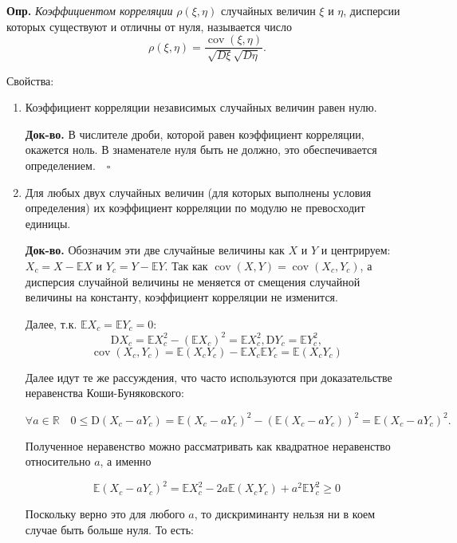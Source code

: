 \documentclass[oneside,final,14pt]{extreport}
\newcommand\mydef{{\bf Опр.}}
\newcommand\myqed{{\bf Док-во.}}
\theoremstyle{definition}
\begin{document}
\mydef{} {\it Коэффициентом корреляции} $\rho(\xi,\eta)$ случайных величин $\xi$ и $\eta$, дисперсии которых существуют и отличны от нуля, называется число
$$\rho(\xi, \eta)=\frac{\operatorname{cov}(\xi, \eta)}{\sqrt{D \xi} \sqrt{D \eta}}.$$

Свойства:

\begin{enumerate}
    \item Коэффициент корреляции независимых случайных величин равен нулю.
    
    \myqed{} В числителе дроби, которой равен коэффициент корреляции,
окажется ноль. В знаменателе нуля быть не должно, это обеспечивается определением.
$ ~~~ \square$

    \item Для любых двух случайных величин (для которых выполнены условия определения) их коэффициент корреляции по модулю не превосходит единицы.
    
    \myqed{} Обозначим эти две случайные величины как $X$ и $Y$ и центрируем: $X_c = X - \mathbb{E}X$ и $Y_c = Y - \mathbb{E}Y$. Так как $\operatorname{cov}(X, Y)=\operatorname{cov}\left(X_{c}, Y_{c}\right)$, а дисперсия случайной величины не меняется от смещения случайной величины на константу, коэффициент корреляции не изменится.
    
    Далее, т.к. $\mathbb{E} X_{c}=\mathbb{E} Y_{c}=0$:
    $$\mathrm{D} X_{c}=\mathbb{E} X_{c}^{2}-\left(\mathbb{E} X_{c}\right)^{2}=\mathbb{E} X_{c}^{2}, \mathrm{D} Y_{c}=\mathbb{E} Y_{c}^{2},$$$$ \operatorname{cov}\left(X_{c}, Y_{c}\right)=\mathbb{E}\left(X_{c} Y_{c}\right)-\mathbb{E} X_{c} \mathbb{E} Y_{c}=\mathbb{E}\left(X_{c} Y_{c}\right)$$
    
    Далее идут те же рассуждения, что часто используются при доказательстве неравенства Коши-Буняковского:
    
    $$\forall a \in \mathbb{R} \quad 0 \leqslant \mathrm{D}\left(X_{c}-a Y_{c}\right)=\mathbb{E}\left(X_{c}-a Y_{c}\right)^{2}-\left(\mathbb{E}\left(X_{c}-a Y_{c}\right)\right)^{2}=\mathbb{E}\left(X_{c}-a Y_{c}\right)^{2}.$$
    
    Полученное неравенство можно рассматривать как квадратное неравенство относительно $a$, а именно
    
    $$\mathbb{E}\left(X_{c}-a Y_{c}\right)^{2}=\mathbb{E} X_{c}^{2}-2 a \mathbb{E}\left(X_{c} Y_{c}\right)+a^{2} \mathbb{E} Y_{c}^{2} \geqslant 0$$
    
    Поскольку верно это для любого $a$, то дискриминанту нельзя ни в коем случае быть больше нуля. То есть:
    

\end{enumerate}
\end{document}
